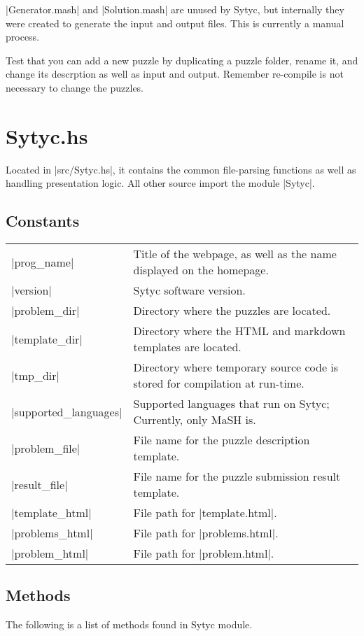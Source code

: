 \documentclass[a4paper]{article}
\begin{document}
|Generator.mash| and |Solution.mash| are unused by Sytyc, but internally they were created to generate the input and output files.  This is currently a manual process.

Test that you can add a new puzzle by duplicating a puzzle folder, rename it, and change its descrption as well as input and output.  Remember re-compile is not necessary to change the puzzles.
\pagebreak
\section{Sytyc.hs}
Located in |src/Sytyc.hs|, it contains the common file-parsing functions as well as handling presentation logic.  All other source import the module |Sytyc|.

\subsection{Constants}
\begin{tabular}{ p{1.5in}p{3in} }
|prog_name| & Title of the webpage, as well as the name displayed on the homepage. \\
|version| & Sytyc software version. \\
|problem_dir| & Directory where the puzzles are located. \\
|template_dir| & Directory where the HTML and markdown templates are located. \\
|tmp_dir| & Directory where temporary source code is stored for compilation at run-time. \\
|supported_languages| & Supported languages that run on Sytyc;  Currently, only MaSH is. \\
|problem_file| & File name for the puzzle description template. \\
|result_file| & File name for the puzzle submission result template. \\
|template_html| & File path for |template.html|. \\
|problems_html| & File path for |problems.html|. \\
|problem_html| & File path for |problem.html|.
\end{tabular}

\subsection{Methods}
The following is a list of methods found in Sytyc module. \\
\end{document}
